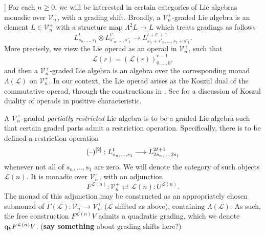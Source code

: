 \documentclass[11pt]{amsart}
\theoremstyle{plain}
\theoremstyle{definition}
\DeclareMathOperator{\im}{im}
\newcommand{\DASH}{\textup{--}}
\renewcommand{\to}{\longrightarrow}
\newcommand{\scrL}{\mathscr{L}}
\newcommand{\calL}{\mathcal{L}}
\newcommand{\calV}{\mathcal{V}}
\theoremstyle{plain}
\newcommand{\LieOperad}{{\scrL}}
\newcommand{\restn}[1]{#1^{[2]}}
\newcommand{\vect}[2]{\calV^{#1}_{#2}}
\newcommand{\quadgrad}[1]{\textup{q}_{#1}}
\begin{document}
\begin{homotopy operations for PRLs}
]%
For each $n\geq0$, we will be interested in certain categories of Lie algebras monadic over $\vect{+}{n}$, with a grading shift. Broadly, a $\vect{+}{n}$-graded Lie algebra is an element $L\in\vect{+}{n}$ with a structure map $\Lambda^2 L\to L$ which treats gradings as follows
\[L^{t}_{s_n,\ldots,s_1}\otimes L^{t'}_{s'_n,\ldots,s'_1}\to L^{t+t'+1}_{s_n+s'_n,\ldots,s_1+s'_1}.\]
More precisely, we view the Lie operad as an operad in $\vect{+}{n}$, such that
\[\LieOperad(r)=(\LieOperad(r))^{r-1}_{0,\ldots,0},\]
and then a $\vect{+}{n}$-graded Lie algebra is an algebra over the corresponding monad $\Lambda(\LieOperad)$ on $\vect{+}{n}$. In our context, the Lie operad arises as the Koszul dual of the commutative operad, through the constructions in \cite[\S5]{MR1089001}. See \cite[\S5.3.4]{FresseKoszulDuality.pdf} for a discussion of Koszul duality of operads in positive characteristic.

A $\vect{+}{n}$-graded \emph{partially restricted} Lie algebra is to be a graded Lie algebra such that certain graded parts admit a restriction operation. Specifically, there is to be defined a restriction operation
\[\restn{(\DASH)}:L^t_{s_n,\ldots,s_1}\to L^{2t+1}_{2s_n,\ldots,2s_1}\]
whenever not all of $s_n,\ldots,s_{1}$ are zero. We will denote the category of such objects $\calL(n)$. It is monadic over $\vect{+}{n}$, with an adjunction
\[F^{\calL(n)}:\vect{+}{n}\rightleftarrows \calL(n):U^{\calL(n)}.\]
The monad of this adjunction may be constructed as an appropriately chosen submonad of $\Gamma(\LieOperad):\vect{+}{n}\to \vect{+}{n}$ ($\LieOperad$ shifted as above), containing $\Lambda(\LieOperad)$. As such, the free construction $F^{\calL(n)}V$ admits a quadratic grading, which we denote $\quadgrad{k}F^{\calL(n)}V$.  (\textbf{say something} about grading shifts here?)


\end{homotopy operations for PRLs}
\end{document}
